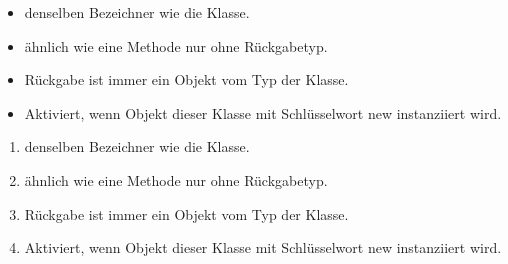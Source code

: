 \documentclass{article}
\begin{document}
\begin{itemize}
    \item denselben Bezeichner wie die Klasse. 
    \item ähnlich wie eine Methode nur ohne Rückgabetyp.
    \item Rückgabe ist immer ein Objekt vom Typ der Klasse.
    \item Aktiviert, wenn Objekt dieser Klasse mit Schlüsselwort new instanziiert wird.
\end{itemize}

\begin{enumerate}[label=\arabic*.]
    \item denselben Bezeichner wie die Klasse. 
    \item ähnlich wie eine Methode nur ohne Rückgabetyp.
    \item Rückgabe ist immer ein Objekt vom Typ der Klasse.
    \item Aktiviert, wenn Objekt dieser Klasse mit Schlüsselwort new instanziiert wird.
\end{enumerate}
\end{document}
